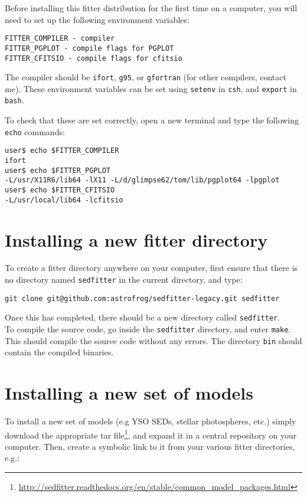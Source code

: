 \documentclass[letterpaper,11pt]{report}
\begin{document}
Before installing this fitter distribution for the first time on a computer, you will need to set up the following environment variables:

\begin{verbatim}
FITTER_COMPILER - compiler
FITTER_PGPLOT - compile flags for PGPLOT
FITTER_CFITSIO - compile flags for cfitsio
\end{verbatim}

The compiler should be \texttt{ifort}, \texttt{g95}, or \texttt{gfortran} (for other compilers, contact me). These environment variables can be set using \texttt{setenv} in \texttt{csh}, and \texttt{export} in \texttt{bash}.

To check that these are set correctly, open a new terminal and type the following \texttt{echo} commands:

\begin{verbatim}
user$ echo $FITTER_COMPILER
ifort
user$ echo $FITTER_PGPLOT
-L/usr/X11R6/lib64 -lX11 -L/d/glimpse62/tom/lib/pgplot64 -lpgplot
user$ echo $FITTER_CFITSIO
-L/usr/local/lib64 -lcfitsio
\end{verbatim}

\section{Installing a new fitter directory}

To create a fitter directory anywhere on your computer, first ensure that there is no directory named \texttt{sedfitter} in the current directory, and type:

\begin{verbatim}
git clone git@github.com:astrofrog/sedfitter-legacy.git sedfitter
\end{verbatim}

Once this has completed, there should be a new directory called \texttt{sedfitter}.\\

To compile the source code, go inside the \texttt{sedfitter} directory, and enter \texttt{make}. This should compile the source code without any errors. The directory \texttt{bin} should contain the compiled binaries.

\section{Installing a new set of models}

To install a new set of models (e.g YSO SEDs, stellar photospheres, etc.) simply download the appropriate tar file\footnote{\url{http://sedfitter.readthedocs.org/en/stable/common_model_packages.html}}, and expand it in a central repository on your computer. Then, create a symbolic link to it from your various fitter directories, e.g.:
\end{document}

